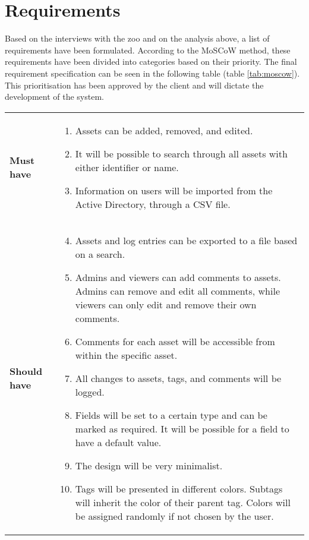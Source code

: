\section{Requirements}\label{sc:requirements}
Based on the interviews with the zoo and on the analysis above, a list of requirements have been formulated. According to the MoSCoW \cite[chap 7.1]{DEB} method, these requirements have been divided into categories based on their priority. The final requirement specification can be seen in the following table (table \ref{tab:moscow}). This prioritisation has been approved by the client and will dictate the development of the system. 

\begin{longtable}{p{3.2cm} p{10cm}}
    \renewcommand{\arraystretch}{2.0}
        \\
        \hline
        \textbf{Must have} & 
        \vspace*{-7mm}
        \begin{enumerate} \itemsep0em 
            \item Assets can be added, removed, and edited.
            \item It will be possible to search through all assets with either identifier or name.
            \item Information on users will be imported from the Active Directory, through a CSV file.
        \end{enumerate}
        \\
        \hline
        
        \textbf{Should have} & 
        \vspace*{-7mm}
        \begin{enumerate} \setcounter{enumi}{3} \itemsep0em 
            \item Assets and log entries can be exported to a file based on a search.
            \item Admins and viewers can add comments to assets. Admins can remove and edit all comments, while viewers can only edit and remove their own comments.
            \item Comments for each asset will be accessible from within the specific asset.
            \item All changes to assets, tags, and comments will be logged.
            \item Fields will be set to a certain type and can be marked as required. It will be possible for a field to have a default value.
            \item The design will be very minimalist.
            \item Tags will be presented in different colors. Subtags will inherit the color of their parent tag. Colors will be assigned randomly if not chosen by the user.
        \end{enumerate}
        \\
        \hline
        

\end{longtable}
